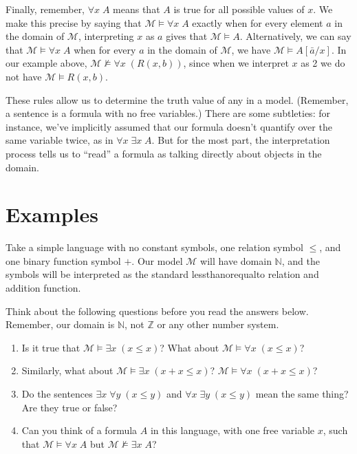 \documentclass[letterpaper,10pt,english]{sphinxmanual}
\begin{document}
\sphinxAtStartPar
Finally, remember, \(\forall x \; A\) means that \(A\) is true for all possible values of \(x\). We make this precise by saying that \({\mathcal M} \models \forall x \; A\) exactly when for every element \(a\) in the domain of \({\mathcal M}\), interpreting \(x\) as \(a\) gives that \({\mathcal M} \models A\). Alternatively, we can say that \({\mathcal M} \models \forall x \; A\) when for every \(a\) in the domain of \({\mathcal M}\), we have \({\mathcal M} \models A[\bar a / x]\). In our example above, \({\mathcal M} \not\models \forall x \; (R(x, b))\), since when we interpret \(x\) as 2 we do not have \({\mathcal M} \models R(x, b)\).

\sphinxAtStartPar
These rules allow us to determine the truth value of any  in a model. (Remember, a sentence is a formula with no free variables.) There are some subtleties: for instance, we’ve implicitly assumed that our formula doesn’t quantify over the same variable twice, as in \(\forall x \; \exists x \; A\). But for the most part, the interpretation process tells us to “read” a formula as talking directly about objects in the domain.


\section{Examples}
\label{\detokenize{semantics_of_first_order_logic:examples}}
\sphinxAtStartPar
Take a simple language with no constant symbols, one relation symbol \(\leq\), and one binary function symbol \(+\). Our model \({\mathcal M}\) will have domain \({\mathbb N}\), and the symbols will be interpreted as the standard less\sphinxhyphen{}than\sphinxhyphen{}or\sphinxhyphen{}equal\sphinxhyphen{}to relation and addition function.

\sphinxAtStartPar
Think about the following questions before you read the answers below. Remember, our domain is \({\mathbb N}\), not \({\mathbb Z}\) or any other number system.
\begin{enumerate}
%
\item {} 
\sphinxAtStartPar
Is it true that \({\mathcal M} \models \exists x \; (x \leq x)\)? What about \({\mathcal M} \models \forall x \; (x \leq x)\)?

\item {} 
\sphinxAtStartPar
Similarly, what about \({\mathcal M} \models \exists x \; (x + x \leq x)\)? \({\mathcal M} \models \forall x \; (x + x \leq x)\)?

\item {} 
\sphinxAtStartPar
Do the sentences \(\exists x \; \forall y \; (x \leq y)\) and \(\forall x \; \exists y \; (x \leq y)\) mean the same thing? Are they true or false?

\item {} 
\sphinxAtStartPar
Can you think of a formula \(A\) in this language, with one free variable \(x\), such that \({\mathcal M} \models \forall x \; A\) but \({\mathcal M} \not \models \exists x \; A\)?

\end{enumerate}
\end{document}

